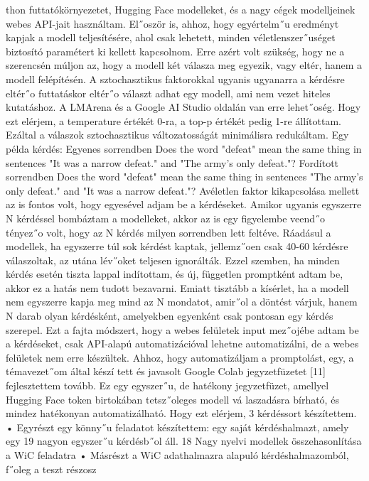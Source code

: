 \documentclass[12pt]{report}
\theoremstyle{definition}
\begin{document}
thon futtatókörnyezetet, Hugging Face modelleket, és a nagy cégek modelljeinek webes
 API-jait használtam.
 El˝oször is, ahhoz, hogy egyértelm˝u eredményt kapjak a modell teljesítésére, ahol
 csak lehetett, minden véletlenszer˝uséget biztosító paramétert ki kellett kapcsolnom. Erre
 azért volt szükség, hogy ne a szerencsén múljon az, hogy a modell két válasza meg
egyezik, vagy eltér, hanem a modell felépítésén. A sztochasztikus faktorokkal ugyanis
 ugyanarra a kérdésre eltér˝o futtatáskor eltér˝o választ adhat egy modell, ami nem vezet
 hiteles kutatáshoz. A LMArena és a Google AI Studio oldalán van erre lehet˝oség.
 Hogy ezt elérjem, a temperature értékét 0-ra, a top-p értékét pedig 1-re állítottam.
 Ezáltal a válaszok sztochasztikus változatosságát minimálisra redukáltam.
 Egy példa kérdés:
 Egyenes sorrendben
 Does the word "defeat" mean the same thing in sentences
 "It was a narrow defeat." and "The army’s only defeat."?
 Fordított sorrendben
 Does the word "defeat" mean the same thing in sentences
 "The army’s only defeat." and "It was a narrow defeat."?
 Avéletlen faktor kikapcsolása mellett az is fontos volt, hogy egyesével adjam be a
 kérdéseket. Amikor ugyanis egyszerre N kérdéssel bombáztam a modelleket, akkor az
 is egy figyelembe veend˝o tényez˝o volt, hogy az N kérdés milyen sorrendben lett feltéve.
 Ráadásul a modellek, ha egyszerre túl sok kérdést kaptak, jellemz˝oen csak 40-60 kérdésre
 válaszoltak, az utána lév˝oket teljesen ignorálták. Ezzel szemben, ha minden kérdés esetén
 tiszta lappal indítottam, és új, független promptként adtam be, akkor ez a hatás nem tudott
 bezavarni. Emiatt tisztább a kísérlet, ha a modell nem egyszerre kapja meg mind az
 N mondatot, amir˝ol a döntést várjuk, hanem N darab olyan kérdésként, amelyekben
 egyenként csak pontosan egy kérdés szerepel.
 Ezt a fajta módszert, hogy a webes felületek input mez˝ojébe adtam be a kérdéseket,
 csak API-alapú automatizációval lehetne automatizálni, de a webes felületek nem erre
 készültek. Ahhoz, hogy automatizáljam a promptolást, egy, a témavezet˝om által készí
tett és javasolt Google Colab jegyzetfüzetet [11] fejlesztettem tovább. Ez egy egyszer˝u,
 de hatékony jegyzetfüzet, amellyel Hugging Face token birtokában tetsz˝oleges modell vá
laszadásra bírható, és mindez hatékonyan automatizálható. Hogy ezt elérjem, 3 kérdéssort
 készítettem.
 • Egyrészt egy könny˝u feladatot készítettem: egy saját kérdéshalmazt, amely egy 19
 nagyon egyszer˝u kérdésb˝ol áll.
 18
Nagy nyelvi modellek összehasonlítása a WiC feladatra
 • Másrészt a WiC adathalmazra alapuló kérdéshalmazomból, f˝oleg a teszt részosz
\end{document}
